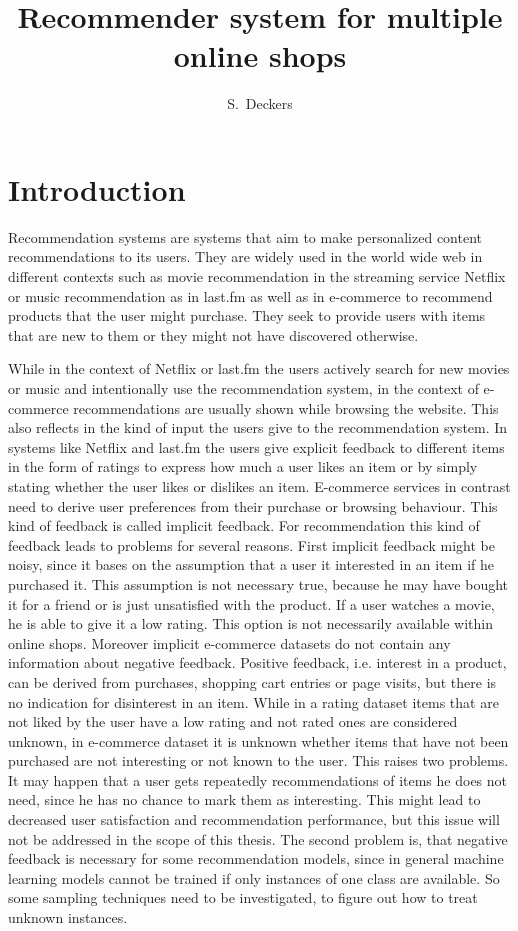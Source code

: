 \documentclass[10pt]{reportMaster}
\title{Recommender system for multiple online shops}
\author{S.\ Deckers}
\date{} %
\begin{document}
\maketitle


\chapter{Introduction}
Recommendation systems are systems that aim to make personalized content recommendations to its users.
They are widely used in the world wide web in different contexts such as movie recommendation in the streaming service Netflix or music recommendation as in last.fm as well as in e-commerce to recommend products that the user might purchase.
They seek to provide users with items that are new to them or they might not have discovered otherwise.

While in the context of Netflix or last.fm the users actively search for new movies or music and intentionally use the recommendation system, in the context of e-commerce recommendations are usually shown while browsing the website.
This also reflects in the kind of input the users give to the recommendation system.
In systems like Netflix and last.fm the users give explicit feedback to different items in the form of ratings to express how much a user likes an item or by simply stating whether the user likes or dislikes an item.
E-commerce services in contrast need to derive user preferences from their purchase or browsing behaviour.
This kind of feedback is called implicit feedback.
For recommendation this kind of feedback leads to problems for several reasons.
First implicit feedback might be noisy, since it bases on the assumption that a user it interested in an item if he purchased it.
This assumption is not necessary true, because he may have bought it for a friend or is just unsatisfied with the product.
If a user watches a movie, he is able to give it a low rating.
This option is not necessarily available within online shops.
Moreover implicit e-commerce datasets do not contain any information about negative feedback.
Positive feedback, i.e. interest in a product, can be derived from purchases, shopping cart entries or page visits, but there is no indication for disinterest in an item.
While in a rating dataset items that are not liked by the user have a low rating and not rated ones are considered unknown, in e-commerce dataset it is unknown whether items that have not been purchased are not interesting or not known to the user.
This raises two problems.
It may happen that a user gets repeatedly recommendations of items he does not need, since he has no chance to mark them as interesting.
This might lead to decreased user satisfaction and recommendation performance, but this issue will not be addressed in the scope of this thesis.
The second problem is, that negative feedback is necessary for some recommendation models, since in general machine learning models cannot be trained if only instances of one class are available.
So some sampling techniques need to be investigated, to figure out how to treat unknown instances.
\end{document}
